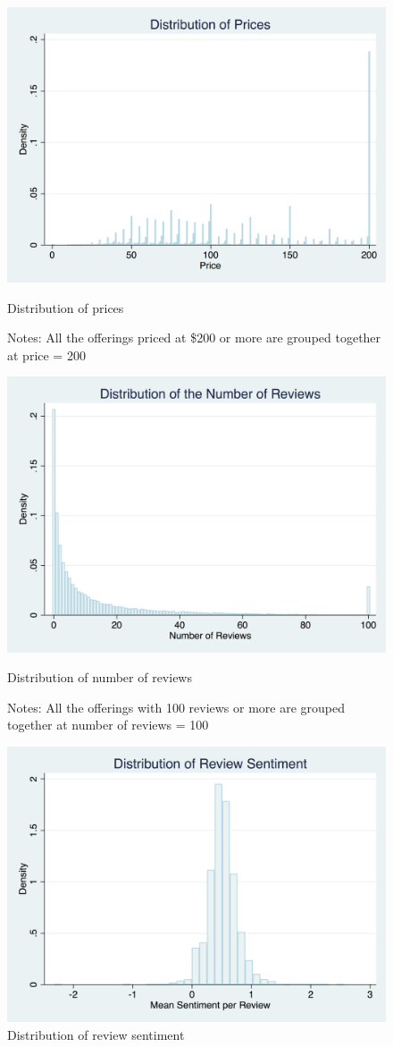 \begin{figure}\centering
	\includegraphics[width=.8\textwidth]{figures/price_dist-DISC-100}
	\caption{Distribution of prices}
	\caption*{Notes: All the offerings priced at \$200 or more are grouped together at price = 200}
\end{figure}
\begin{figure}\centering
	\includegraphics[width=.8\textwidth]{figures/num_reviews_dist-DISC-100}
	\caption{Distribution of number of reviews}
	\caption*{Notes: All the offerings with 100 reviews or more are grouped together at number of reviews = 100}
\end{figure}
\begin{figure}\centering
	\includegraphics[width=.8\textwidth]{figures/review_sentiment_dist}
	\caption{Distribution of review sentiment}
\end{figure}
